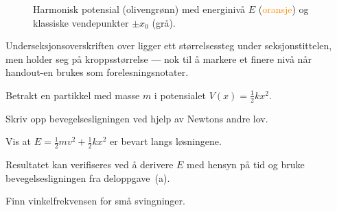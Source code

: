 \documentclass[11pt]{article}
\begin{document}
\begin{figure}[ht]
  \centering
  \caption{Harmonisk potensial (\textcolor{darkolive}{olivengrønn}) med
           energinivå $E$ (\textcolor{darkorange}{oransje}) og klassiske vendepunkter $\pm x_0$ (grå).}
  \label{fig:potensial}
\end{figure}

Underseksjonsoverskriften over ligger ett størrelsessteg under seksjonstittelen, men holder seg på kroppsstørrelse --- nok til å markere et finere nivå når handout-en brukes som forelesningsnotater.


\begin{oppgave}
Betrakt en partikkel med masse $m$ i potensialet $V(x) = \tfrac{1}{2}kx^2$.

\begin{deloppgaver}
  \item Skriv opp bevegelsesligningen ved hjelp av Newtons andre lov.
  \item Vis at $E = \tfrac{1}{2}mv^2 + \tfrac{1}{2}kx^2$ er bevart langs løsningene.
\end{deloppgaver}

Resultatet kan verifiseres ved å derivere $E$ med hensyn på tid og bruke bevegelsesligningen fra deloppgave~(a).

\begin{deloppgaver}[resume]
  \item Finn vinkelfrekvensen for små svingninger.
\end{deloppgaver}
\end{oppgave}
\end{document}
